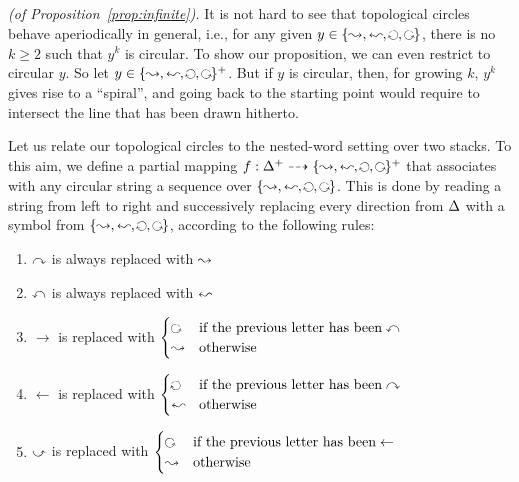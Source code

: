 \documentclass{LMCS}
\begin{document}
\begin{Proof}{\it (of Proposition~\ref{prop:infinite}).}
  It is not hard to see that topological circles behave aperiodically in
  general, i.e., for any given $y \in
  \{\rightright,\leftleft,\rightleft,\leftright\}$, there is no $k \ge 2$ such
  that $y^k$ is circular. To show our proposition, we can even restrict to
  circular $y$. So let $y \in
  \{\rightright,\leftleft,\rightleft,\leftright\}^+$. But if $y$ is circular,
  then, for growing $k$, $y^k$ gives rise to a ``spiral'', and going back to
  the starting point would require to intersect the line that has been drawn
  hitherto.

  Let us relate our topological circles to the nested-word setting over two
  stacks. To this aim, we define a partial mapping $f: \Dir^+ \dashrightarrow
  \{\rightright,\leftleft,\rightleft,\leftright\}^+$ that associates with any
  circular string a sequence over
  $\{\rightright,\leftleft,\rightleft,\leftright\}$. This is done by reading a
  string from left to right and successively replacing every direction from
  $\Delta$ with a symbol from $\{\rightright,\leftleft,\rightleft,\leftright\}$,
  according to the following rules:
\begin{enumerate}[$\bullet$]
\item $\mathrel{\curvearrowright}$ is always replaced with $\mathrel{\leadsto}$

\item $\mathrel{\curvearrowleft}$ is always replaced with $\leftleft$

\item $\rightarrow$ is replaced with
$\begin{cases}
  \leftright & \text{if the previous letter has been} \leftone\\
 \rightright & \text{otherwise}
\end{cases}$


\item $\leftarrow$ is replaced with
$\begin{cases}
\rightleft & \text{if the previous letter has been} \rightone\\
\leftleft & \text{otherwise}
\end{cases}$

\item $\righttwo$ is replaced with
$\begin{cases}
\leftright & \text{if the previous letter has been} \leftarrow\\
\rightright & \text{otherwise}
\end{cases}$


\end{enumerate}
\end{Proof}
\end{document}
